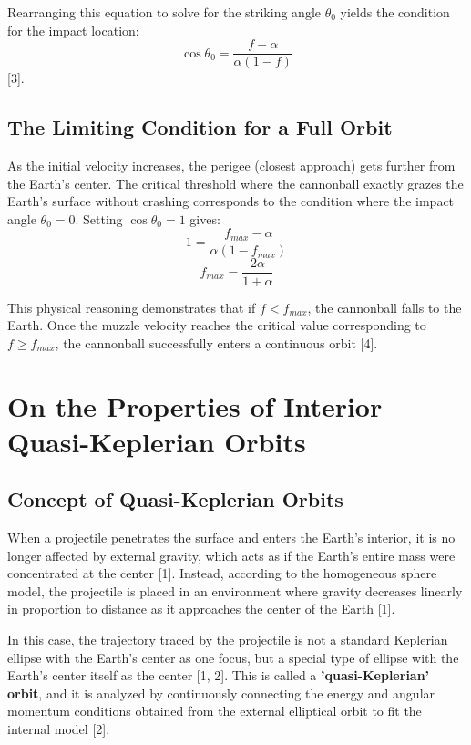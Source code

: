 \documentclass[11pt,letterpaper]{article}
\begin{document}
Rearranging this equation to solve for the striking angle $\theta_0$ yields the condition for the impact location:
\begin{equation}
    \cos\theta_0 = \frac{f - \alpha}{\alpha(1 - f)}
\end{equation} [3].

\subsection{The Limiting Condition for a Full Orbit}
As the initial velocity increases, the perigee (closest approach) gets further from the Earth's center. The critical threshold where the cannonball exactly grazes the Earth's surface without crashing corresponds to the condition where the impact angle $\theta_0 = 0$. Setting $\cos\theta_0 = 1$ gives:
\begin{equation}
    1 = \frac{f_{max} - \alpha}{\alpha(1 - f_{max})}
\end{equation}
\begin{equation}
    f_{max} = \frac{2\alpha}{1 + \alpha}
\end{equation}

This physical reasoning demonstrates that if $f < f_{max}$, the cannonball falls to the Earth. Once the muzzle velocity reaches the critical value corresponding to $f \ge f_{max}$, the cannonball successfully enters a continuous orbit [4].

\section{On the Properties of Interior Quasi-Keplerian Orbits}

\subsection{Concept of Quasi-Keplerian Orbits}
When a projectile penetrates the surface and enters the Earth's interior, it is no longer affected by external gravity, which acts as if the Earth's entire mass were concentrated at the center [1]. Instead, according to the homogeneous sphere model, the projectile is placed in an environment where gravity decreases linearly in proportion to distance as it approaches the center of the Earth [1]. 

In this case, the trajectory traced by the projectile is not a standard Keplerian ellipse with the Earth's center as one focus, but a special type of ellipse with the Earth's center itself as the center [1, 2]. This is called a \textbf{'quasi-Keplerian' orbit}, and it is analyzed by continuously connecting the energy and angular momentum conditions obtained from the external elliptical orbit to fit the internal model [2].
\end{document}
